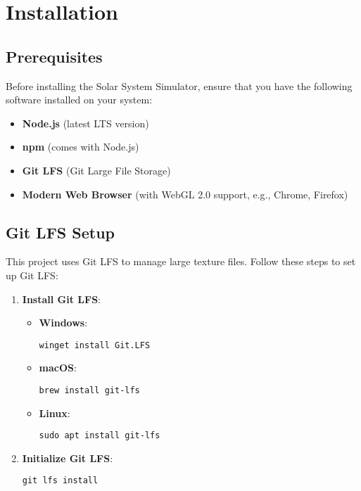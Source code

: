 \documentclass[12pt, a4paper]{article}
\begin{document}
\section{Installation}

\subsection{Prerequisites}

Before installing the Solar System Simulator, ensure that you have the
following software installed on your system:

\begin{itemize}
    \item \textbf{Node.js} (latest LTS version)
    \item \textbf{npm} (comes with Node.js)
    \item \textbf{Git LFS} (Git Large File Storage)
    \item \textbf{Modern Web Browser} (with WebGL 2.0 support, e.g., Chrome, Firefox)
\end{itemize}

\newpage

\subsection{Git LFS Setup}

This project uses Git LFS to manage large texture files. Follow these steps to
set up Git LFS:

\begin{enumerate}
    \item \textbf{Install Git LFS}:

          \begin{itemize}
              \item \textbf{Windows}:
                    \begin{verbatim}
winget install Git.LFS
        \end{verbatim}
              \item \textbf{macOS}:
                    \begin{verbatim}
brew install git-lfs
        \end{verbatim}
              \item \textbf{Linux}:
                    \begin{verbatim}
sudo apt install git-lfs
        \end{verbatim}
          \end{itemize}

    \item \textbf{Initialize Git LFS}:

          \begin{verbatim}
git lfs install
    \end{verbatim}

\end{enumerate}
\end{document}
